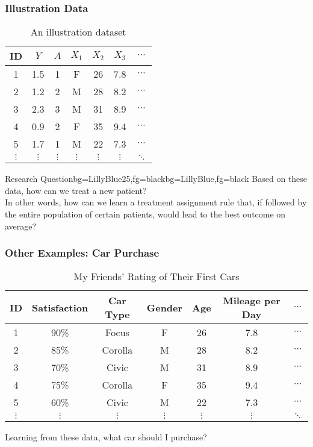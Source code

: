 \documentclass{beamer}
\begin{document}
\begin{frame}
	\frametitle{Illustration Data}
	\begin{table}[htbp]
		\centering
		\caption{An illustration dataset}
		\begin{tabular}{c|c|c|cccc}
			\hline
			\hline
			ID& $Y$     & $A$   & $X_1$    & $X_2$    & $X_3$    & $\cdots$ \\
			\hline
			1& 1.5  & 1     & F     & 26    & 7.8   & $\cdots$ \\
			2 &1.2  & 2     & M     & 28    & 8.2   & $\cdots$  \\
			3 &2.3  & 3     & M     & 31    & 8.9   & $\cdots$  \\
			4&0.9  & 2     & F     & 35    & 9.4   & $\cdots$  \\
			5& 1.7  & 1     & M     & 22    & 7.3   & $\cdots$  \\
			$\vdots$  & $\vdots$  & $\vdots$    & $\vdots$   & $\vdots$     & $\vdots$     & $\ddots$  \\
			\hline
			\hline
		\end{tabular}%
		\label{tab:ITRDataProblem}%
	\end{table}%
	\begin{variableblock}{Research Question}{bg=LillyBlue25,fg=black}{bg=LillyBlue,fg=black}
		Based on these data, how can we treat a new patient?  \\
		In other words, how can we learn a treatment assignment rule that, if followed by the entire population of certain patients, would lead to the best outcome on average?
	\end{variableblock}
	
\end{frame}

\begin{frame}
	\frametitle{Other Examples: Car Purchase}
	\begin{table}[htbp]
		\centering
		\caption{My Friends' Rating of Their First Cars}
		\begin{tabular}{c|c|c|cccc}
			\hline
			\hline
			ID& Satisfaction    & Car Type   & Gender    & Age    &  Mileage per Day   & $\cdots$ \\
			\hline
			1& 90\%  & Focus     & F     & 26    & 7.8   & $\cdots$ \\
			2 &85\%  & Corolla     & M     & 28    & 8.2   & $\cdots$  \\
			3 &70\%  & Civic    & M     & 31    & 8.9   & $\cdots$  \\
			4&75\%  & Corolla     & F     & 35    & 9.4   & $\cdots$  \\
			5& 60\%  & Civic    & M     & 22    & 7.3   & $\cdots$  \\
			$\vdots$  & $\vdots$  & $\vdots$    & $\vdots$   & $\vdots$     & $\vdots$     & $\ddots$  \\
			\hline
			\hline
		\end{tabular}%
		\label{tab:ITRDataProblem2}%
	\end{table}%
	Learning from these data, what car should I purchase?
\end{frame}
\end{document}
